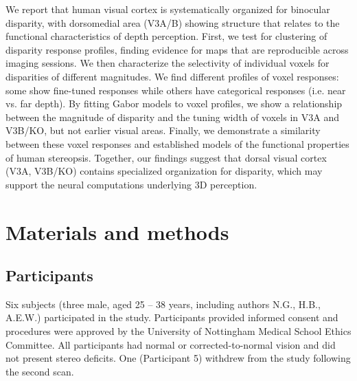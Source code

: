 We report that human visual cortex is systematically organized for binocular disparity, with dorsomedial area (V3A/B) showing structure that relates to the functional characteristics of depth perception. First, we test for clustering of disparity response profiles, finding evidence for maps that are reproducible across imaging sessions. We then characterize the selectivity of individual voxels for disparities of different magnitudes. We find different profiles of voxel responses: some show fine-tuned responses while others have categorical responses (i.e. near vs. far depth). By fitting Gabor models to voxel profiles, we show a relationship between the magnitude of disparity and the tuning width of voxels in V3A and V3B/KO, but not earlier visual areas. Finally, we demonstrate a similarity between these voxel responses and established models of the functional properties of human stereopsis. Together, our findings suggest that dorsal visual cortex (V3A, V3B/KO) contains specialized organization for disparity, which may support the neural computations underlying 3D perception.


\section{Materials and methods}

\subsection{Participants}

Six subjects (three male, aged 25 -- 38 years, including authors N.G., H.B., A.E.W.) participated in the study. Participants provided informed consent and procedures were approved by the University of Nottingham Medical School Ethics Committee. All participants had normal or corrected-to-normal vision and did not present stereo deficits. One (Participant 5) withdrew from the study following the second scan.


